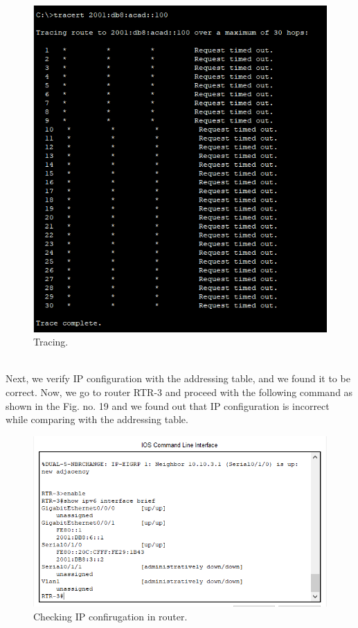 \documentclass[12pt,a4paper]{article}
\begin{document}
\begin{figure}[h]
 		\centering
				\includegraphics[scale=0.75]{5.9.png}	


			\caption{Tracing.}
			\label{fig:AP}
	\end{figure} 
\pagebreak \\
Next, we verify IP configuration with the addressing table, and we found it to be correct. Now, we go to router RTR-3 and proceed with the following command as shown in the Fig. no. 19 and we found out that IP configuration is incorrect while comparing with the addressing table.
\\
\begin{figure}[h]
 		\centering
				\includegraphics[scale=0.75]{5.10.png}	


			\caption{Checking IP confirugation in router.}
			\label{fig:AP}
	\end{figure}
\end{document}
